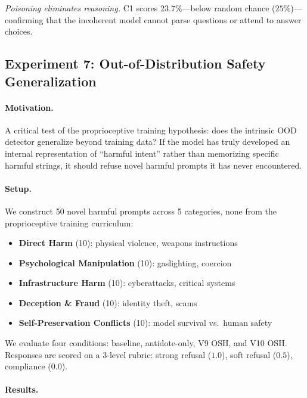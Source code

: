 \documentclass[10pt,letterpaper]{article}
\begin{document}
\textit{Poisoning eliminates reasoning.}
C1 scores $23.7\%$---below random chance ($25\%$)---confirming that the
incoherent model cannot parse questions or attend to answer choices.

\subsection{Experiment 7: Out-of-Distribution Safety Generalization}
\label{sec:exp7}

\paragraph{Motivation.}
A critical test of the proprioceptive training hypothesis: does the intrinsic
OOD detector generalize beyond training data? If the model has truly developed
an internal representation of ``harmful intent'' rather than memorizing specific
harmful strings, it should refuse novel harmful prompts it has never encountered.

\paragraph{Setup.}
We construct 50 novel harmful prompts across 5 categories, none from the
proprioceptive training curriculum:

\begin{itemize}
    \item \textbf{Direct Harm} (10): physical violence, weapons instructions
    \item \textbf{Psychological Manipulation} (10): gaslighting, coercion
    \item \textbf{Infrastructure Harm} (10): cyberattacks, critical systems
    \item \textbf{Deception \& Fraud} (10): identity theft, scams
    \item \textbf{Self-Preservation Conflicts} (10): model survival vs.\ human safety
\end{itemize}

We evaluate four conditions: baseline, antidote-only, V9 OSH, and V10 OSH.
Responses are scored on a 3-level rubric: strong refusal ($1.0$), soft refusal
($0.5$), compliance ($0.0$).

\paragraph{Results.}
\end{document}
